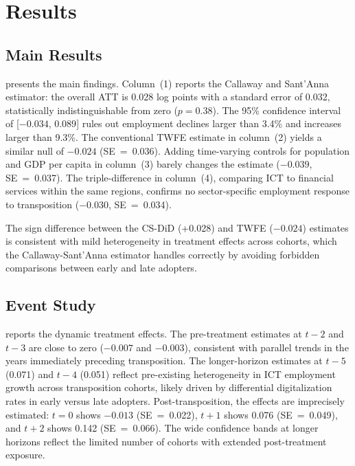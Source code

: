 \documentclass[12pt]{article}
\begin{document}
\section{Results}

\subsection{Main Results}

 presents the main findings. Column~(1) reports the Callaway and Sant'Anna estimator: the overall ATT is 0.028 log points with a standard error of 0.032, statistically indistinguishable from zero ($p = 0.38$). The 95\% confidence interval of [$-0.034$, $0.089$] rules out employment declines larger than 3.4\% and increases larger than 9.3\%. The conventional TWFE estimate in column~(2) yields a similar null of $-0.024$ (SE~=~0.036). Adding time-varying controls for population and GDP per capita in column~(3) barely changes the estimate ($-0.039$, SE~=~0.037). The triple-difference in column~(4), comparing ICT to financial services within the same regions, confirms no sector-specific employment response to transposition ($-0.030$, SE~=~0.034).

The sign difference between the CS-DiD (+0.028) and TWFE ($-0.024$) estimates is consistent with mild heterogeneity in treatment effects across cohorts, which the Callaway-Sant'Anna estimator handles correctly by avoiding forbidden comparisons between early and late adopters.



\subsection{Event Study}

 reports the dynamic treatment effects. The pre-treatment estimates at $t-2$ and $t-3$ are close to zero ($-0.007$ and $-0.003$), consistent with parallel trends in the years immediately preceding transposition. The longer-horizon estimates at $t-5$ (0.071) and $t-4$ (0.051) reflect pre-existing heterogeneity in ICT employment growth across transposition cohorts, likely driven by differential digitalization rates in early versus late adopters. Post-transposition, the effects are imprecisely estimated: $t = 0$ shows $-0.013$ (SE~=~0.022), $t+1$ shows 0.076 (SE~=~0.049), and $t+2$ shows 0.142 (SE~=~0.066). The wide confidence bands at longer horizons reflect the limited number of cohorts with extended post-treatment exposure.
\end{document}
